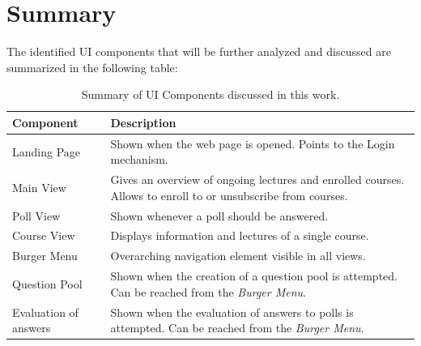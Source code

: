 \section{Summary}
The identified UI components that will be further analyzed and discussed are summarized in the following table:

\begin{table}[H]
	{\renewcommand{\arraystretch}{2}
		\begin{tabular}{ | p{4cm} | p{11cm} |}
			\hline
			Component & Description \\ \hline \hline
			Landing Page & Shown when the web page is opened. Points to the Login mechanism. \\ \hline
			Main View & Gives an overview of ongoing lectures and enrolled courses. Allows to enroll to or unsubscribe from courses. \\ \hline
			Poll View & Shown whenever a poll should be answered. \\ \hline
			Course View & Displays information and lectures of a single course. \\ \hline
			Burger Menu & Overarching navigation element visible in all views. \\ \hline
			Question Pool & Shown when the creation of a question pool is attempted. Can be reached from the \emph{Burger Menu}. \\ \hline
			Evaluation of answers & Shown when the evaluation of answers to polls is attempted. Can be reached from the \emph{Burger Menu}. \\ \hline
		\end{tabular}
	}
	\caption{Summary of UI Components discussed in this work.}
	\label{tab:components}
\end{table}

